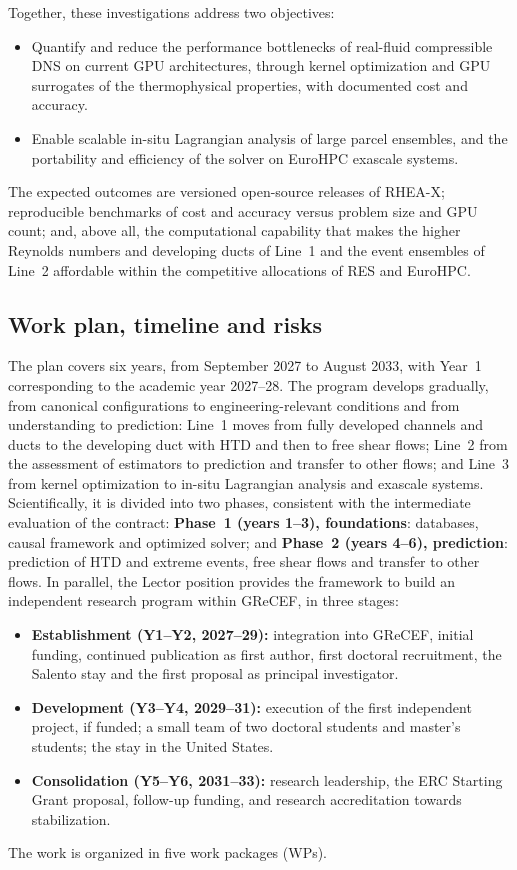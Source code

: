 \documentclass[11pt]{article}
\begin{document}
Together, these investigations address two objectives:
\begin{itemize}
  \item[\textbf{O7.}] Quantify and reduce the performance bottlenecks of real-fluid compressible
  DNS on current GPU architectures, through kernel optimization and GPU surrogates of the
  thermophysical properties, with documented cost and accuracy.
  \item[\textbf{O8.}] Enable scalable in-situ Lagrangian analysis of large parcel ensembles, and
  the portability and efficiency of the solver on EuroHPC exascale systems.
\end{itemize}
The expected outcomes are versioned open-source releases of RHEA-X; reproducible benchmarks of cost
and accuracy versus problem size and GPU count; and, above all, the computational capability that
makes the higher Reynolds numbers and developing ducts of Line~1 and the event ensembles of Line~2
affordable within the competitive allocations of RES and EuroHPC.

\subsection{Work plan, timeline and risks}\label{sec:workplan}
The plan covers six years, from September 2027 to August 2033, with Year~1 corresponding to
the academic year 2027--28. The program develops gradually, from canonical configurations to
engineering-relevant conditions and from understanding to prediction: Line~1 moves from fully
developed channels and ducts to the developing duct with HTD and then to free shear flows;
Line~2 from the assessment of estimators to prediction and transfer to other flows; and Line~3
from kernel optimization to in-situ Lagrangian analysis and exascale systems. Scientifically, it is divided into two phases, consistent with the
intermediate evaluation of the contract: \textbf{Phase~1 (years 1--3), foundations}:
databases, causal framework and optimized solver; and \textbf{Phase~2 (years 4--6),
prediction}: prediction of HTD and extreme events, free shear flows and transfer to other
flows. In parallel, the Lector position
provides the framework to build an independent research program within GReCEF, in three
stages:
\begin{itemize}
  \item \textbf{Establishment (Y1--Y2, 2027--29):} integration into GReCEF, initial funding,
  continued publication as first author, first doctoral recruitment, the Salento stay and the first proposal as principal
  investigator.
  \item \textbf{Development (Y3--Y4, 2029--31):} execution of the first independent project,
  if funded; a small team of two doctoral students and master's students; the stay in the
  United States.
  \item \textbf{Consolidation (Y5--Y6, 2031--33):} research leadership, the ERC Starting Grant
  proposal, follow-up funding, and research accreditation towards stabilization.
\end{itemize}
The work is organized in five work packages (WPs).
\end{document}
